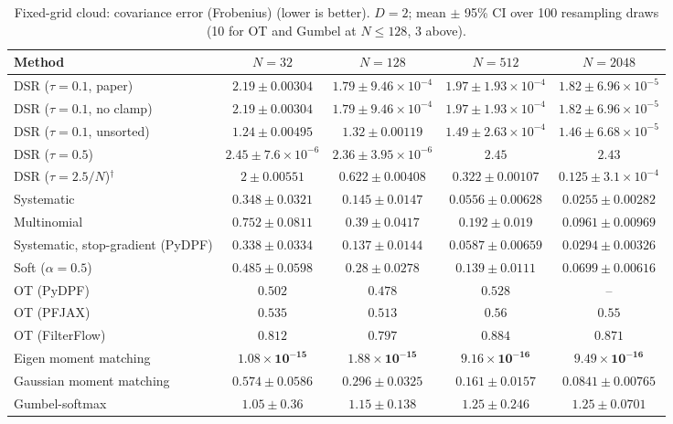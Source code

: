 \begin{table}[H]
\centering
\small
\caption{Fixed-grid cloud: covariance error (Frobenius) (lower is better). $D{=}2$; mean $\pm$ 95\% CI over 100 resampling draws (10 for OT and Gumbel at $N\le128$, 3 above).}
\label{tab:static-fixed-covariance_error}
\begin{adjustbox}{max width=\linewidth}
\begin{tabular}{lcccc}
\toprule
Method & $N{=}32$ & $N{=}128$ & $N{=}512$ & $N{=}2048$ \\
\midrule
DSR ($\tau{=}0.1$, paper) & $2.19\pm0.00304$ & $1.79\pm9.46\times10^{-4}$ & $1.97\pm1.93\times10^{-4}$ & $1.82\pm6.96\times10^{-5}$ \\
DSR ($\tau{=}0.1$, no clamp) & $2.19\pm0.00304$ & $1.79\pm9.46\times10^{-4}$ & $1.97\pm1.93\times10^{-4}$ & $1.82\pm6.96\times10^{-5}$ \\
DSR ($\tau{=}0.1$, unsorted) & $1.24\pm0.00495$ & $1.32\pm0.00119$ & $1.49\pm2.63\times10^{-4}$ & $1.46\pm6.68\times10^{-5}$ \\
DSR ($\tau{=}0.5$) & $2.45\pm7.6\times10^{-6}$ & $2.36\pm3.95\times10^{-6}$ & $2.45$ & $2.43$ \\
DSR ($\tau{=}2.5/N$)$^\dagger$ & $2\pm0.00551$ & $0.622\pm0.00408$ & $0.322\pm0.00107$ & $0.125\pm3.1\times10^{-4}$ \\
\midrule
Systematic & $0.348\pm0.0321$ & $0.145\pm0.0147$ & $0.0556\pm0.00628$ & $0.0255\pm0.00282$ \\
Multinomial & $0.752\pm0.0811$ & $0.39\pm0.0417$ & $0.192\pm0.019$ & $0.0961\pm0.00969$ \\
Systematic, stop-gradient (PyDPF) & $0.338\pm0.0334$ & $0.137\pm0.0144$ & $0.0587\pm0.00659$ & $0.0294\pm0.00326$ \\
Soft ($\alpha{=}0.5$) & $0.485\pm0.0598$ & $0.28\pm0.0278$ & $0.139\pm0.0111$ & $0.0699\pm0.00616$ \\
OT (PyDPF) & $0.502$ & $0.478$ & $0.528$ & -- \\
OT (PFJAX) & $0.535$ & $0.513$ & $0.56$ & $0.55$ \\
OT (FilterFlow) & $0.812$ & $0.797$ & $0.884$ & $0.871$ \\
Eigen moment matching & $\mathbf{1.08\times10^{-15}}$ & $\mathbf{1.88\times10^{-15}}$ & $\mathbf{9.16\times10^{-16}}$ & $\mathbf{9.49\times10^{-16}}$ \\
Gaussian moment matching & $0.574\pm0.0586$ & $0.296\pm0.0325$ & $0.161\pm0.0157$ & $0.0841\pm0.00765$ \\
Gumbel-softmax & $1.05\pm0.36$ & $1.15\pm0.138$ & $1.25\pm0.246$ & $1.25\pm0.0701$ \\

\end{tabular}
\end{adjustbox}
\end{table}
